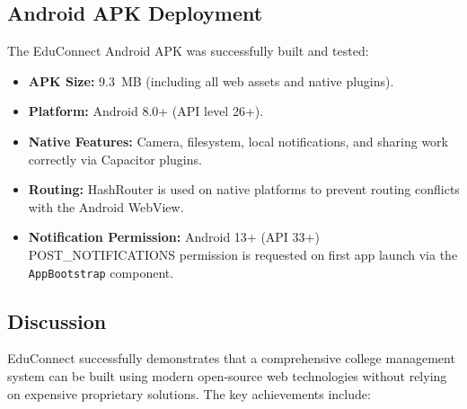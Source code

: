 \subsection{Android APK Deployment}

The EduConnect Android APK was successfully built and tested:

\begin{itemize}[leftmargin=2em]
    \item \textbf{APK Size:} 9.3~MB (including all web assets and native plugins).
    \item \textbf{Platform:} Android 8.0+ (API level 26+).
    \item \textbf{Native Features:} Camera, filesystem, local notifications, and sharing work correctly via Capacitor plugins.
    \item \textbf{Routing:} HashRouter is used on native platforms to prevent routing conflicts with the Android WebView.
    \item \textbf{Notification Permission:} Android 13+ (API 33+) POST\_NOTIFICATIONS permission is requested on first app launch via the \texttt{AppBootstrap} component.
\end{itemize}

\subsection{Discussion}

EduConnect successfully demonstrates that a comprehensive college management system can be built using modern open-source web technologies without relying on expensive proprietary solutions. The key achievements include:

